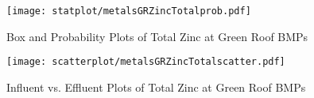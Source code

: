         \begin{figure}[hb]   %
            \centering
            \texttt{[image: statplot/metalsGRZincTotalprob.pdf]}
            \caption{Box and Probability Plots of Total Zinc at Green Roof BMPs}
        \end{figure}         %
        
        
        \begin{figure}[hb]   %
            \centering
            \texttt{[image: scatterplot/metalsGRZincTotalscatter.pdf]}
            \caption{Influent vs. Effluent Plots of Total Zinc at Green Roof BMPs}
        \end{figure}         %
        \clearpage
        